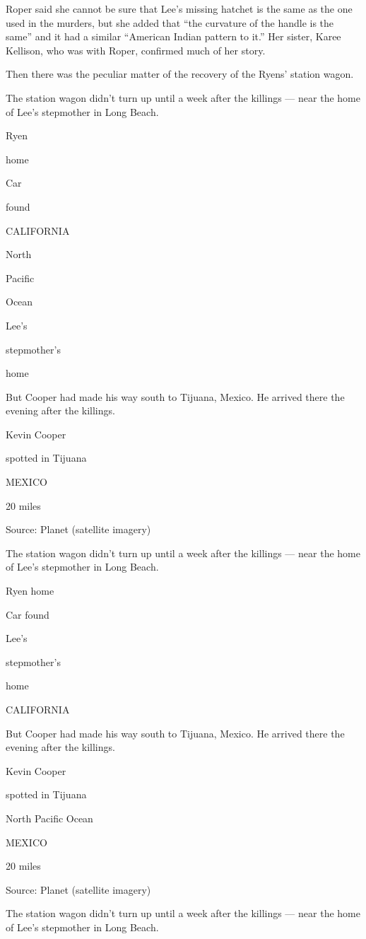 Roper said she cannot be sure that Lee's missing hatchet is the same as
the one used in the murders, but she added that ``the curvature of the
handle is the same'' and it had a similar ``American Indian pattern to
it.'' Her sister, Karee Kellison, who was with Roper, confirmed much of
her story.

Then there was the peculiar matter of the recovery of the Ryens' station
wagon.

The station wagon didn't turn up until a week after the killings ---
near the home of Lee's stepmother in Long Beach.

Ryen

home

Car

found

CALIFORNIA

North

Pacific

Ocean

Lee's

stepmother's

home

But Cooper had made his way south to Tijuana, Mexico. He arrived there
the evening after the killings.

Kevin Cooper

spotted in Tijuana

MEXICO

20 miles

Source: Planet (satellite imagery)

The station wagon didn't turn up until a week after the killings ---
near the home of Lee's stepmother in Long Beach.

Ryen home

Car found

Lee's

stepmother's

home

CALIFORNIA

But Cooper had made his way south to Tijuana, Mexico. He arrived there
the evening after the killings.

Kevin Cooper

spotted in Tijuana

North Pacific Ocean

MEXICO

20 miles

Source: Planet (satellite imagery)

The station wagon didn't turn up until a week after the killings ---
near the home of Lee's stepmother in Long Beach.

